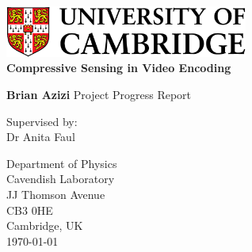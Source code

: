 \documentclass[final,3p]{report}
\begin{document}



\begin{titlepage}
\begin{center}
\includegraphics[width=0.6\textwidth]{cam.png}\\

\vspace*{4cm}
\Huge\textbf{Compressive Sensing in Video Encoding}

\vspace*{1.5cm}
\LARGE
\textbf{Brian Azizi}
\vfill
Project Progress Report

\vspace{0.8cm}

\normalsize
Supervised by:\\
Dr Anita Faul

\vspace{0.2cm}
Department of Physics\\
Cavendish Laboratory\\
JJ Thomson Avenue\\
CB3 0HE\\
Cambridge, UK\\
\vspace{0.4cm}
\normalsize
\today

\end{center}
\end{titlepage}
\end{document}
